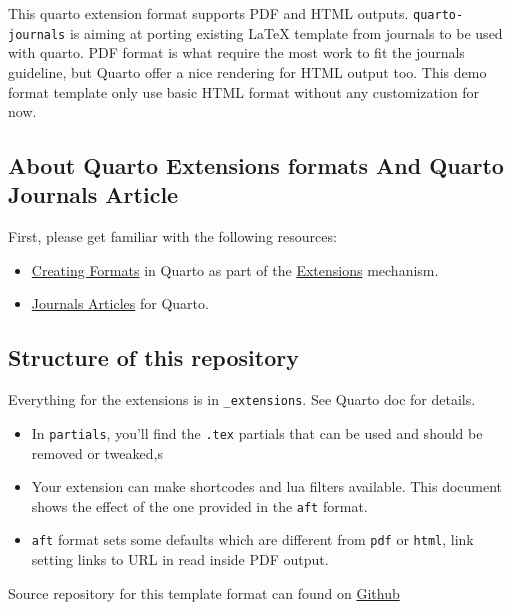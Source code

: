 \documentclass[manuscript,screen,review]{acmart}
\providecommand{\tightlist}{%
  \setlength{\itemsep}{0pt}\setlength{\parskip}{0pt}}\usepackage{longtable,booktabs,array}
\begin{document}
This quarto extension format supports PDF and HTML outputs.
\texttt{quarto-journals} is aiming at porting existing {\LaTeX} template
from journals to be used with quarto. PDF format is what require the
most work to fit the journals guideline, but Quarto offer a nice
rendering for HTML output too. This demo format template only use basic
HTML format without any customization for now.

\subsection{About Quarto Extensions formats And Quarto Journals
Article}\label{about-quarto-extensions-formats-and-quarto-journals-article}

First, please get familiar with the following resources:

\begin{itemize}
\tightlist
\item
  \href{https://quarto.org/docs/extensions/formats.html}{Creating
  Formats} in Quarto as part of the
  \href{https://quarto.org/docs/extensions/}{Extensions} mechanism.
\item
  \href{https://quarto.org/docs/journals/}{Journals Articles} for
  Quarto.
\end{itemize}

\subsection{Structure of this
repository}\label{structure-of-this-repository}

Everything for the extensions is in \texttt{\_extensions}. See Quarto
doc for details.

\begin{itemize}
\item
  In \texttt{partials}, you'll find the \texttt{.tex} partials that can
  be used and should be removed or tweaked,s
\item
  Your extension can make shortcodes and lua filters available. This
  document shows the effect of the one provided in the \texttt{aft}
  format.
\item
  \texttt{aft} format sets some defaults which are different from
  \texttt{pdf} or \texttt{html}, link setting links to URL in read
  inside PDF output.
\end{itemize}

Source repository for this template format can found on
\href{https://github.com/quarto-journals/article-format-template}{Github}
\end{document}
